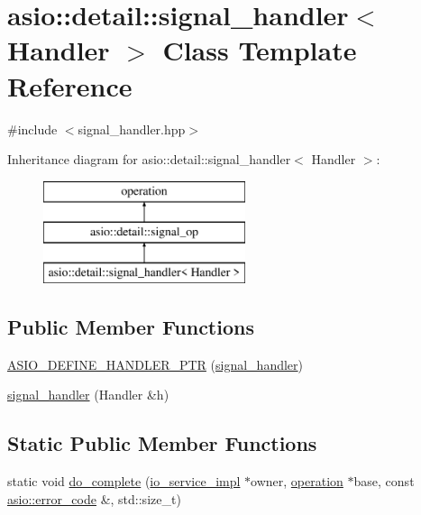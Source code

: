 \hypertarget{classasio_1_1detail_1_1signal__handler}{}\section{asio\+:\+:detail\+:\+:signal\+\_\+handler$<$ Handler $>$ Class Template Reference}
\label{classasio_1_1detail_1_1signal__handler}


{\ttfamily \#include $<$signal\+\_\+handler.\+hpp$>$}

Inheritance diagram for asio\+:\+:detail\+:\+:signal\+\_\+handler$<$ Handler $>$\+:\begin{figure}[H]
\begin{center}
\leavevmode
\includegraphics[height=3.000000cm]{classasio_1_1detail_1_1signal__handler}
\end{center}
\end{figure}
\subsection*{Public Member Functions}
\begin{DoxyCompactItemize}
\item 
\hyperlink{classasio_1_1detail_1_1signal__handler_a1abf53e6268acb5e80c1c6f01bf6a7bf}{A\+S\+I\+O\+\_\+\+D\+E\+F\+I\+N\+E\+\_\+\+H\+A\+N\+D\+L\+E\+R\+\_\+\+P\+T\+R} (\hyperlink{classasio_1_1detail_1_1signal__handler}{signal\+\_\+handler})
\item 
\hyperlink{classasio_1_1detail_1_1signal__handler_a627b5088dc6f93bccd750cfe74164c9f}{signal\+\_\+handler} (Handler \&h)
\end{DoxyCompactItemize}
\subsection*{Static Public Member Functions}
\begin{DoxyCompactItemize}
\item 
static void \hyperlink{classasio_1_1detail_1_1signal__handler_a9c75f6e23bbb9abfd0393a705b3240ae}{do\+\_\+complete} (\hyperlink{namespaceasio_1_1detail_a6d61d9b8e53c11288be549d82aec5a42}{io\+\_\+service\+\_\+impl} $\ast$owner, \hyperlink{namespaceasio_1_1detail_a338968609bec20e37145309f8f9ec936}{operation} $\ast$base, const \hyperlink{classasio_1_1error__code}{asio\+::error\+\_\+code} \&, std\+::size\+\_\+t)
\end{DoxyCompactItemize}
